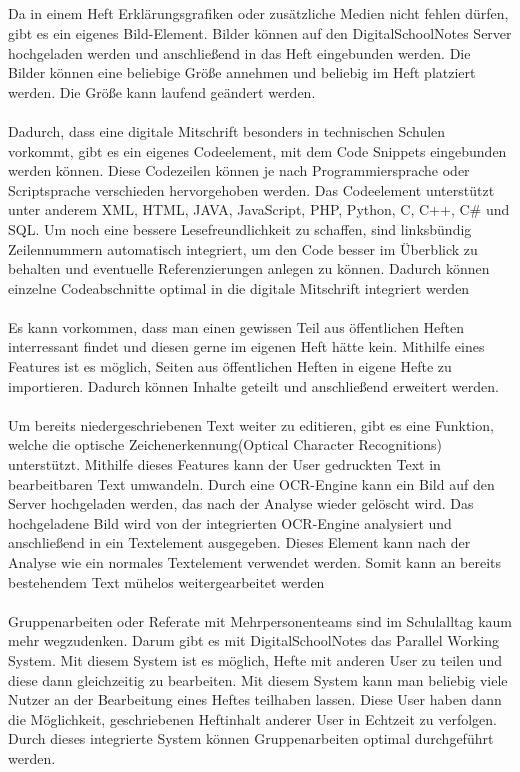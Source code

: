 \\\\\\\\
Da in einem Heft Erklärungsgrafiken oder zusätzliche Medien nicht fehlen dürfen, gibt es ein eigenes Bild-Element. Bilder können auf den DigitalSchoolNotes Server hochgeladen werden und anschließend in das Heft eingebunden werden. Die Bilder können eine beliebige Größe annehmen und beliebig im Heft platziert werden. Die Größe kann laufend geändert werden.\\
\\
Dadurch, dass eine digitale Mitschrift besonders in technischen Schulen vorkommt, gibt es ein eigenes Codeelement, mit dem Code Snippets eingebunden werden können. Diese Codezeilen können je nach Programmiersprache oder Scriptsprache verschieden hervorgehoben werden. Das Codeelement unterstützt unter anderem XML, HTML, JAVA, JavaScript, PHP, Python, C, C++, C\# und SQL. Um noch eine bessere Lesefreundlichkeit zu schaffen, sind linksbündig Zeilennummern automatisch integriert, um den Code besser im Überblick zu behalten und eventuelle Referenzierungen anlegen zu können. Dadurch können einzelne Codeabschnitte optimal in die digitale Mitschrift integriert werden\\
\\
Es kann vorkommen, dass man einen gewissen Teil aus öffentlichen Heften interressant findet und diesen gerne im eigenen Heft hätte kein. Mithilfe eines Features ist es möglich, Seiten aus öffentlichen Heften in eigene Hefte zu importieren. Dadurch können Inhalte geteilt und anschließend erweitert werden. \\
\\
Um bereits niedergeschriebenen Text weiter zu editieren, gibt es eine Funktion, welche die optische Zeichenerkennung(Optical Character Recognitions) unterstützt. Mithilfe dieses Features kann der User gedruckten Text in bearbeitbaren Text umwandeln. Durch eine OCR-Engine kann ein Bild auf den Server hochgeladen werden, das nach der Analyse wieder gelöscht wird. Das hochgeladene Bild wird von der integrierten OCR-Engine analysiert und anschließend in ein Textelement ausgegeben. Dieses Element kann nach der Analyse wie ein normales Textelement verwendet werden. Somit kann an bereits bestehendem Text mühelos weitergearbeitet werden\\
\\
Gruppenarbeiten oder Referate mit Mehrpersonenteams sind im Schulalltag kaum mehr wegzudenken. Darum gibt es mit DigitalSchoolNotes das Parallel Working System. Mit diesem System ist es möglich, Hefte mit anderen User zu teilen und diese dann gleichzeitig zu bearbeiten. Mit diesem System kann man beliebig viele Nutzer an der Bearbeitung eines Heftes teilhaben lassen. Diese User haben dann die Möglichkeit, geschriebenen Heftinhalt anderer User in Echtzeit zu verfolgen. Durch dieses integrierte System können Gruppenarbeiten optimal durchgeführt werden.\\
